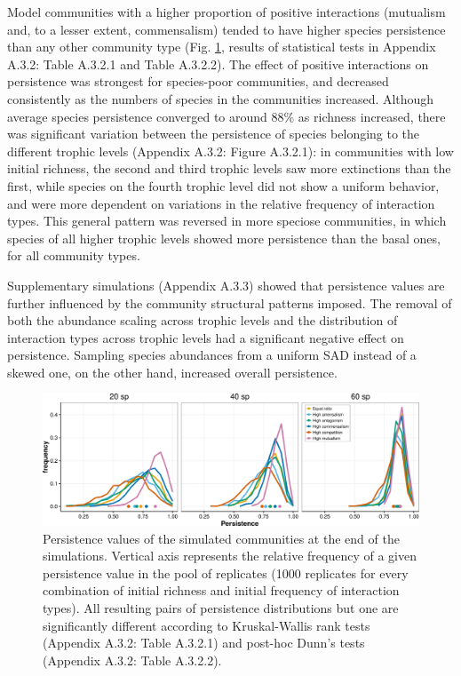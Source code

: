 Model communities with a higher proportion of positive interactions (mutualism and, to a lesser extent, commensalism) tended to have higher species persistence than any other community type (Fig. \ref{fig:fig3.2}, results of statistical tests in Appendix A.3.2: Table A.3.2.1 and Table A.3.2.2). The effect of positive interactions on persistence was strongest for species-poor communities, and decreased consistently as the numbers of species in the communities increased. Although average species persistence converged to around 88\% as richness increased, there was significant variation between the persistence of species belonging to the different trophic levels (Appendix A.3.2: Figure A.3.2.1): in communities with low initial richness, the second and third trophic levels saw more extinctions than the first, while species on the fourth trophic level did not show a uniform behavior, and were more dependent on variations in the relative frequency of interaction types. This general pattern was reversed in more speciose communities, in which species of all higher trophic levels showed more persistence than the basal ones, for all community types.

Supplementary simulations (Appendix A.3.3) showed that persistence values are further influenced by the community structural patterns imposed. The removal of both the abundance scaling across trophic levels and the distribution of interaction types across trophic levels had a significant negative effect on persistence. Sampling species abundances from a uniform SAD instead of a skewed one, on the other hand, increased overall persistence.

\begin{figure}[!ht]
\centering
\includegraphics[width=\textwidth]{./Figures/chapter03/Fig_2.png}
\caption[Persistence of model communities]{\color{Gray} Persistence values of the simulated communities at the end of the simulations. Vertical axis represents the relative frequency of a given persistence value in the pool of replicates (1000 replicates for every combination of initial richness and initial frequency of interaction types). All resulting pairs of persistence distributions but one are significantly different according to Kruskal-Wallis rank tests (Appendix A.3.2: Table A.3.2.1) and post-hoc Dunn’s tests (Appendix A.3.2: Table A.3.2.2).}
\label{fig:fig3.2}
\end{figure}

